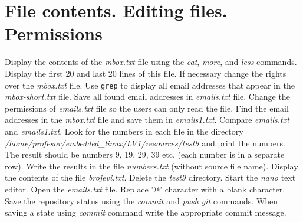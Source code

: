 \documentclass[11pt]{article}
\begin{document}
\section{File contents. Editing files. Permissions}
Display the contents of the \textit{mbox.txt} file using the \textit{cat},
 \textit{more}, and \textit{less} commands. Display the first 20 and last 20
 lines of this file. If necessary change the rights over the
 \textit{mbox.txt} file.
\newline
\newline
Use \texttt{grep} to display all email addresses that appear in
the \textit{mbox-short.txt} file.
 Save all found email addresses in \textit{emails.txt} file. Change the
 permissions of \textit{emails.txt} file so the users can only read the file.
\newline
\newline
Find the email addresses in the \textit{mbox.txt} file and save them in
 \textit{emails1.txt}. Compare \textit{emails.txt} and \textit{emails1.txt}.
 Look for the numbers in each file in the directory
 \textit{/home/profesor/embedded\_linux/LV1/resources/test9} and print the numbers.
 The result should be numbers 9, 19, 29, 39 etc. (each number is in a separate
 row). Write the results in the file \textit{numbers.txt} (without source file
 name). Display the contents of the file \textit{brojevi.txt}. Delete the
 \textit{test9} directory.
\newline
\newline
Start the \textit{nano} text editor. Open the \textit{emails.txt} file. Replace
 '@' character with a blank character.
\newline
\newline
Save the repository status using the \textit{commit} and \textit{push}
 \textit{git} commands. When saving a state using \textit{commit} command write
 the appropriate commit message.
\end{document}
